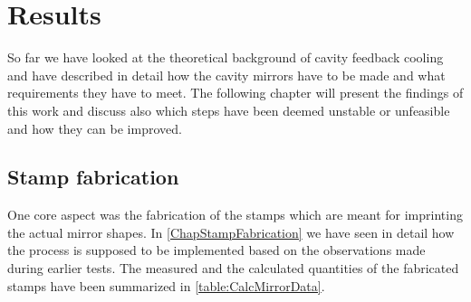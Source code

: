 \chapter{Results}
So far we have looked at the theoretical background of cavity feedback cooling and have described in detail how the cavity mirrors have to be made and what requirements they have to meet. The following chapter will present the findings of this work and discuss also which steps have been deemed unstable or unfeasible and how they can be improved.

\section{Stamp fabrication}
One core aspect was the fabrication of the stamps which are meant for imprinting the actual mirror shapes. In \autoref{ChapStampFabrication} we have seen in detail how the process is supposed to be implemented based on the observations made during earlier tests. The measured and the calculated quantities of the fabricated stamps have been summarized in \autoref{table:CalcMirrorData}.
